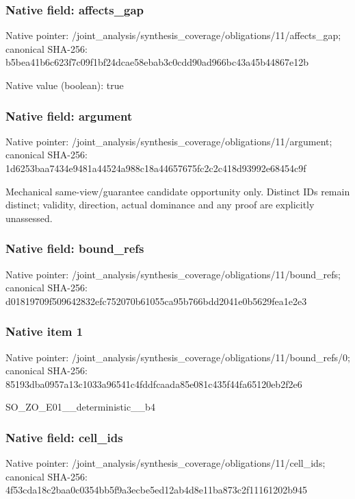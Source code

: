 \documentclass[10pt,a4paper]{article}
\begin{document}
\subsubsection{Native field: affects\_\allowbreak{}gap}
Native pointer: /joint\_\allowbreak{}analysis/synthesis\_\allowbreak{}coverage/obligations/11/affects\_\allowbreak{}gap; canonical SHA-256: b5bea41b6c623f7c09f1bf24dcae58ebab3c0cdd90ad966bc43a45b44867e12b

Native value (boolean): true

\subsubsection{Native field: argument}
Native pointer: /joint\_\allowbreak{}analysis/synthesis\_\allowbreak{}coverage/obligations/11/argument; canonical SHA-256: 1d6253baa7434e9481a44524a988c18a44657675fc2c2c418d93992e68454c9f

\begingroup\raggedright\sloppy Mechanical same-view/\allowbreak{}guarantee candidate opportunity only. Distinct IDs remain distinct;\allowbreak{} validity,\allowbreak{} direction,\allowbreak{} actual dominance and any proof are explicitly unassessed.\par\endgroup

\subsubsection{Native field: bound\_\allowbreak{}refs}
Native pointer: /joint\_\allowbreak{}analysis/synthesis\_\allowbreak{}coverage/obligations/11/bound\_\allowbreak{}refs; canonical SHA-256: d01819709f509642832efc752070b61055ca95b766bdd2041e0b5629fea1e2e3

\subsubsection{Native item 1}
Native pointer: /joint\_\allowbreak{}analysis/synthesis\_\allowbreak{}coverage/obligations/11/bound\_\allowbreak{}refs/0; canonical SHA-256: 85193dba0957a13c1033a96541c4fddfcaada85e081c435f44fa65120eb2f2e6

\begingroup\raggedright\sloppy SO\_\allowbreak{}ZO\_\allowbreak{}E01\_\allowbreak{}\_\allowbreak{}deterministic\_\allowbreak{}\_\allowbreak{}b4\par\endgroup

\subsubsection{Native field: cell\_\allowbreak{}ids}
Native pointer: /joint\_\allowbreak{}analysis/synthesis\_\allowbreak{}coverage/obligations/11/cell\_\allowbreak{}ids; canonical SHA-256: 4f53cda18c2baa0c0354bb5f9a3ecbe5ed12ab4d8e11ba873c2f11161202b945
\end{document}
